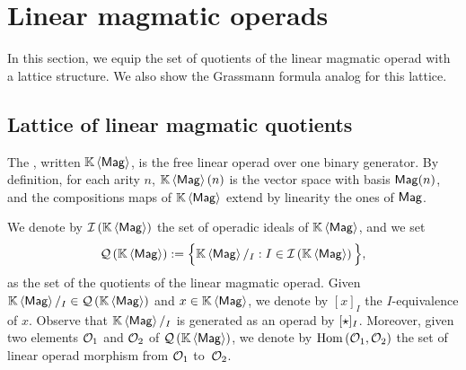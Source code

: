 \section{Linear magmatic operads}
\label{sec:Magmatic_operads}
In this section, we equip the set of quotients of the linear magmatic
operad with a lattice structure. We also show the Grassmann formula
analog for this lattice.
\medbreak

\subsection{Lattice of linear magmatic quotients}
The , written $\KMag$, is the free linear
operad over one binary generator. By definition, for each arity $n$,
$\KMag(n)$ is the vector space with basis $\Mag(n)$, and the
compositions maps of $\KMag$ extend by linearity the ones of $\Mag$.
\medbreak

We denote by $\IMag$ the set of operadic ideals of $\KMag$, and we set
\begin{equation} \label{equ:definition_of_QMag}
    \QMag := \Big\{\KMag/_I :  I\in\IMag\Big\},
\end{equation}
as the set of the quotients of the linear magmatic operad. Given
$\KMag/_I \in \QMag$ and $x \in \KMag$, we denote by $[x]_I$ the
$I$-equivalence of $x$. Observe that $\KMag/_I$ is generated as an
operad by $[\Product]_I$. Moreover, given two  elements $\Oca_1$ and
$\Oca_2$ of $\QMag$, we denote by $\Hom\left(\Oca_1,\Oca_2\right)$ the
set of linear operad morphism from $\Oca_1$ to~$\Oca_2$.
\medbreak

